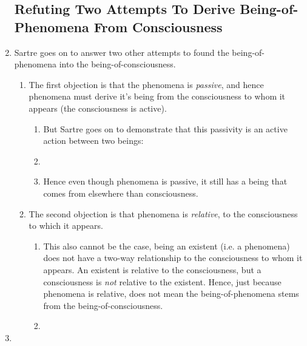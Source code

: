 \begin{enumerate}
  \subsection{Refuting Two Attempts To Derive Being-of-Phenomena From Consciousness}
  \item Sartre goes on to answer two other attempts to found the being-of-phenomena into the being-of-consciousness.
  \begin{enumerate}
    \item The first objection is that the phenomena is \emph{passive}, and hence phenomena must derive it's being from the consciousness to whom it appears (the consciousness is active).
    \begin{enumerate}
      \item But Sartre goes on to demonstrate that this passivity is an active action between two beings:
      \item {}
      \item Hence even though phenomena is passive, it still has a being that comes from elsewhere than consciousness.
    \end{enumerate}
    \item The second objection is that phenomena is \emph{relative}, to the consciousness to which it appears. 
    \begin{enumerate}
      \item This also cannot be the case, being an existent (i.e. a phenomena) does not have a two-way relationship to the consciousness to whom it appears. An existent is relative to the consciousness, but a consciousness is \emph{not} relative to the existent. Hence, just because phenomena is relative, does not mean the being-of-phenomena stems from the being-of-consciousness.
      \item {}
    \end{enumerate}
  \end{enumerate}
  \item {}
\end{enumerate}

